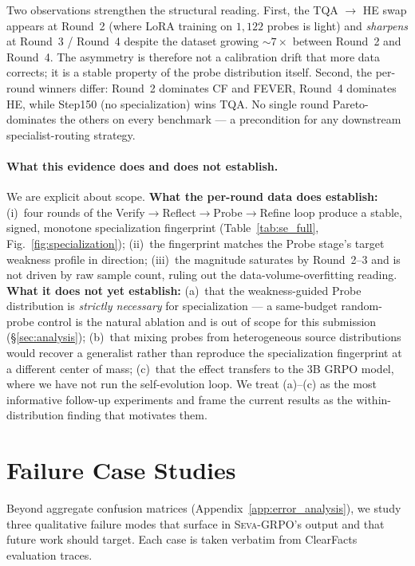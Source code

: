 \documentclass{article}
\newcommand{\seva}{\textsc{Seva}\xspace}
\begin{document}
Two observations strengthen the structural reading.
First, the TQA $\to$ HE swap appears at Round~2 (where LoRA training on $1{,}122$ probes is light) and \emph{sharpens} at Round~3 / Round~4 despite the dataset growing $\sim$$7\times$ between Round~2 and Round~4.
The asymmetry is therefore not a calibration drift that more data corrects; it is a stable property of the probe distribution itself.
Second, the per-round winners differ: Round~2 dominates CF and FEVER, Round~4 dominates HE, while Step150 (no specialization) wins TQA.
No single round Pareto-dominates the others on every benchmark --- a precondition for any downstream specialist-routing strategy.

\paragraph{What this evidence does and does not establish.}
We are explicit about scope. \textbf{What the per-round data does establish:} (i)~four rounds of the Verify$\to$Reflect$\to$Probe$\to$Refine loop produce a stable, signed, monotone specialization fingerprint (Table~\ref{tab:se_full}, Fig.~\ref{fig:specialization}); (ii)~the fingerprint matches the Probe stage's target weakness profile in direction; (iii)~the magnitude saturates by Round~2--3 and is not driven by raw sample count, ruling out the data-volume-overfitting reading.
\textbf{What it does not yet establish:} (a)~that the weakness-guided Probe distribution is \emph{strictly necessary} for specialization --- a same-budget random-probe control is the natural ablation and is out of scope for this submission (\S\ref{sec:analysis}); (b)~that mixing probes from heterogeneous source distributions would recover a generalist rather than reproduce the specialization fingerprint at a different center of mass; (c)~that the effect transfers to the 3B GRPO model, where we have not run the self-evolution loop.
We treat (a)--(c) as the most informative follow-up experiments and frame the current results as the within-distribution finding that motivates them.


\section{Failure Case Studies}
\label{app:failure}

Beyond aggregate confusion matrices (Appendix~\ref{app:error_analysis}), we study three qualitative failure modes that surface in \seva-GRPO's output and that future work should target.
Each case is taken verbatim from ClearFacts evaluation traces.
\end{document}
